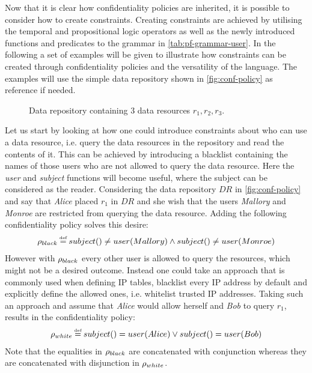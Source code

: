 Now that it is clear how confidentiality policies are inherited, it is possible to consider how to create constraints. Creating constraints are achieved by utilising the temporal and propositional logic operators as well as the newly introduced functions and predicates to the grammar in \autoref{tab:pf-grammar-user}. In the following a set of examples will be given to illustrate how constraints can be created through confidentiality policies and the versatility of the language. The examples will use the simple data repository shown in \autoref{fig:conf-policy} as reference if needed.

\begin{figure}[!ht]
    \begin{center}
        
        \caption{Data repository containing 3 data resources $r_1, r_2, r_3$.}
        \label{fig:conf-policy}
    \end{center}
\end{figure}

\begin{example}\label{ex:conf-reader-constraints}
Let us start by looking at how one could introduce constraints about who can use a data resource, i.e. query the data resources in the repository and read the contents of it. This can be achieved by introducing a blacklist containing the names of those users who are not allowed to query the data resource. Here the \emph{user} and \emph{subject} functions will become useful, where the subject can be considered as the reader. Considering the data repository $DR$ in \autoref{fig:conf-policy} and say that \emph{Alice} placed $r_1$ in $DR$ and she wish that the users \emph{Mallory} and \emph{Monroe} are restricted from querying the data resource. Adding the following confidentiality policy solves this desire:
\begin{align*}
    \conf_{black} \eqdef subject() \neq user(Mallory) \land subject() \neq user(Monroe)
\end{align*}
However with $\rho_{black}$ every other user is allowed to query the resources, which might not be a desired outcome. Instead one could take an approach that is commonly used when defining IP tables, blacklist every IP address by default and explicitly define the allowed ones, i.e. whitelist trusted IP addresses. Taking such an approach and assume that \emph{Alice} would allow herself and \emph{Bob} to query $r_1$, results in the confidentiality policy:
\begin{align*}
    \conf_{white} \eqdef subject() = user(Alice) \lor subject() = user(Bob)
\end{align*}
Note that the equalities in $\rho_{black}$ are concatenated with conjunction whereas they are concatenated with disjunction in $\rho_{white}$.
\end{example}

